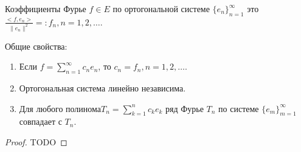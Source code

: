 Коэффициенты Фурье $f\in E$ по ортогональной системе $\{e_n\}_{n=1}^\infty$ это $\frac{<f,e_n>}{\|e_n\|^2}=:f_n, n=1,2,\ldots$.

Общие свойства:
\begin{enumerate}
	\item Если $f=\sum\limits_{n=1}^\infty c_n e_n$, то $c_n=f_n,n=1,2,\ldots$.
	\item Ортогональная система линейно независима.
	\item Для любого полинома$T_n=\sum\limits_{k=1}^n c_ke_k$ ряд Фурье $T_n$ по системе $\{e_m\}_{m=1}^\infty$ совпадает с $T_n$.
\end{enumerate}
\begin{proof}
TODO
\end{proof}


























